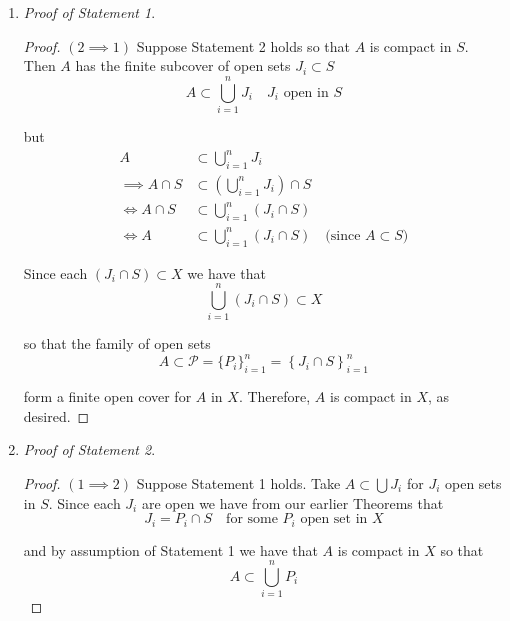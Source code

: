 \documentclass[12pt]{article}
\begin{document}
\begin{enumerate}
	\item {\em Proof of Statement 1}. 

	\begin{proof} $(2 \implies 1)$ Suppose Statement 2 holds so that $A$ is compact in 	$S$. Then $A$ has the finite subcover of open sets $J_i \subset S$
	\begin{equation*}
		A \subset \bigcup^n_{i = 1} J_i \quad \text{$J_i$ open in $S$}
	\end{equation*}
	
	but
	\begin{align*}
		A &\subset \bigcup^n_{i = 1} J_i \\
		\implies A \cap S &\subset \left( \bigcup^n_{i = 1} J_i \right) \cap S \\
		\iff A \cap S &\subset \bigcup^n_{i = 1} \left( J_i \cap S \right) \\
		\iff A &\subset \bigcup^n_{i = 1} \left( J_i \cap S \right) \quad \text{(since $A \subset S$)}
	\end{align*}
	
	Since each $\left( J_i \cap S \right) \subset X$ we have that
	\begin{equation*}
		\bigcup^n_{i = 1} \left( J_i \cap S \right) \subset X
	\end{equation*}

	so that the family of open sets
	\begin{equation*}
		A \subset \mathcal P = \{P_i\}^n_{i = 1} = \left\{ J_i \cap S \right\}^n_{i = 1}
	\end{equation*}
	
	form a finite open cover for $A$ in $X$. Therefore, $A$ is compact in $X$, as desired.
\end{proof}
	
	\item {\em Proof of Statement 2}.

	\begin{proof} $(1\implies 2)$ Suppose Statement 1 holds. Take $A \subset \bigcup J_i$ for $J_i$ open sets in $S$. Since each $J_i$ are open we have from our earlier Theorems that
	\begin{equation*}
		J_i = P_i \cap S \quad \text{for some $P_i$ open set in $X$}
	\end{equation*}
	
	and by assumption of Statement 1 we have that $A$ is compact in $X$ so that
	\begin{equation*}
		A \subset \bigcup^{n}_{i = 1} P_{i}
	\end{equation*}
	

\end{proof}
\end{enumerate}
\end{document}
